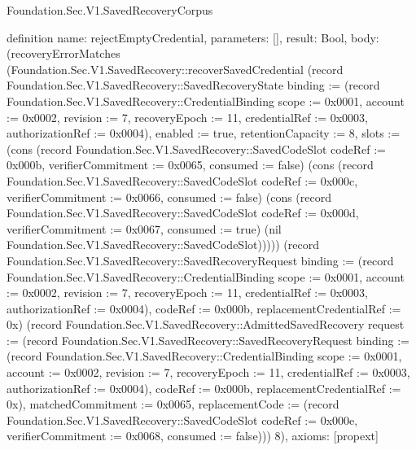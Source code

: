 \begin{lexlean}{Foundation.Sec.V1.SavedRecoveryCorpus}
\begin{semanticmodule}
definition{
  name: rejectEmptyCredential,
  parameters: [],
  result: Bool,
  body: (recoveryErrorMatches (Foundation.Sec.V1.SavedRecovery::recoverSavedCredential (record Foundation.Sec.V1.SavedRecovery::SavedRecoveryState {binding := (record Foundation.Sec.V1.SavedRecovery::CredentialBinding {scope := 0x0001, account := 0x0002, revision := 7, recoveryEpoch := 11, credentialRef := 0x0003, authorizationRef := 0x0004}), enabled := true, retentionCapacity := 8, slots := (cons (record Foundation.Sec.V1.SavedRecovery::SavedCodeSlot {codeRef := 0x000b, verifierCommitment := 0x0065, consumed := false}) (cons (record Foundation.Sec.V1.SavedRecovery::SavedCodeSlot {codeRef := 0x000c, verifierCommitment := 0x0066, consumed := false}) (cons (record Foundation.Sec.V1.SavedRecovery::SavedCodeSlot {codeRef := 0x000d, verifierCommitment := 0x0067, consumed := true}) (nil Foundation.Sec.V1.SavedRecovery::SavedCodeSlot))))}) (record Foundation.Sec.V1.SavedRecovery::SavedRecoveryRequest {binding := (record Foundation.Sec.V1.SavedRecovery::CredentialBinding {scope := 0x0001, account := 0x0002, revision := 7, recoveryEpoch := 11, credentialRef := 0x0003, authorizationRef := 0x0004}), codeRef := 0x000b, replacementCredentialRef := 0x}) (record Foundation.Sec.V1.SavedRecovery::AdmittedSavedRecovery {request := (record Foundation.Sec.V1.SavedRecovery::SavedRecoveryRequest {binding := (record Foundation.Sec.V1.SavedRecovery::CredentialBinding {scope := 0x0001, account := 0x0002, revision := 7, recoveryEpoch := 11, credentialRef := 0x0003, authorizationRef := 0x0004}), codeRef := 0x000b, replacementCredentialRef := 0x}), matchedCommitment := 0x0065, replacementCode := (record Foundation.Sec.V1.SavedRecovery::SavedCodeSlot {codeRef := 0x000e, verifierCommitment := 0x0068, consumed := false})})) 8),
  axioms: [propext]
}


\end{semanticmodule}
\end{lexlean}
